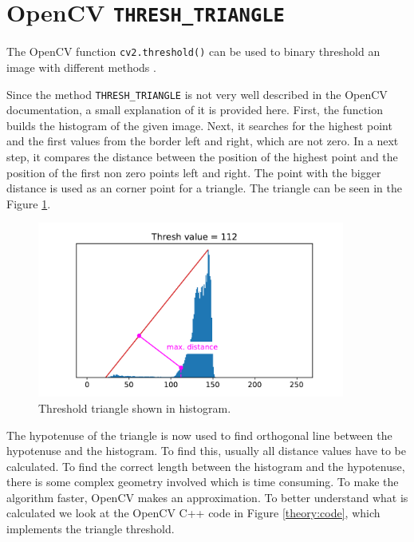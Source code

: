 \clearpage
\section{OpenCV \texttt{THRESH\_TRIANGLE}}
The OpenCV function \texttt{cv2.threshold()} can be used to binary threshold an image with different methods \cite{cv_thresh}.

Since the method \texttt{THRESH\_TRIANGLE} is not very well described in the OpenCV documentation, a small explanation of it is provided here. First, the function builds the histogram of the given image. Next, it searches for the highest point and the first values from the border left and right, which are not zero. In a next step, it compares the distance between the position of the highest point and the position of the first non zero points left and right. The point with the bigger distance is used as an corner point for a triangle. The triangle can be seen in the Figure \ref{theory:triangle}.
\begin{figure}[ht]
	\centering
	\includegraphics[width=0.9\textwidth]{2-theory/threshold/triangle.pdf}
	\caption{Threshold triangle shown in histogram.\label{theory:triangle}}
\end{figure} 
The hypotenuse of the triangle is now used to find orthogonal line between the hypotenuse and the histogram. To find this, usually all distance values have to be calculated. To find the correct length between the histogram and the hypotenuse, there is some complex geometry involved which is time consuming. To make the algorithm faster, OpenCV makes an approximation. To better understand what is calculated we look at the OpenCV C++ code in Figure \ref{theory:code}, which implements the triangle threshold. 


